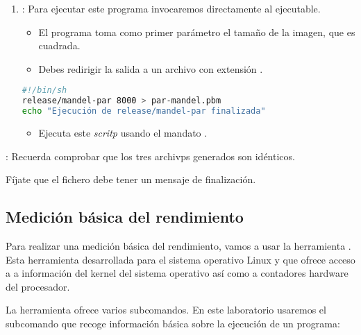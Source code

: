 \begin{enumerate}
  \item {}: Para ejecutar este programa invocaremos directamente al
        ejecutable.
    \begin{itemize}
      \item El programa toma como primer parámetro el tamaño de la imagen, que es cuadrada.
      \item Debes redirigir la salida a un archivo con extensión .
    \end{itemize}

\begin{lstlisting}[language=bash,title={Archivo: run-par-mandel.sh},frame=single]
#!/bin/sh
release/mandel-par 8000 > par-mandel.pbm
echo "Ejecución de release/mandel-par finalizada"
\end{lstlisting}
    \begin{itemize}
      \item Ejecuta este \emph{scritp} usando el mandato .
    \end{itemize}
\end{enumerate}


: Recuerda comprobar que los tres archivps 
generados son idénticos.

Fíjate que el fichero  debe tener un mensaje de finalización.

\subsection{Medición básica del rendimiento}

Para realizar una medición básica del rendimiento, vamos a usar la
herramienta . Esta herramienta desarrollada para el sistema
operativo Linux y que ofrece acceso a a información del kernel
del sistema operativo así como a contadores hardware del procesador.

La herramienta  ofrece varios subcomandos. En este
laboratorio usaremos el subcomando  que recoge información
básica sobre la ejecución de un programa:

